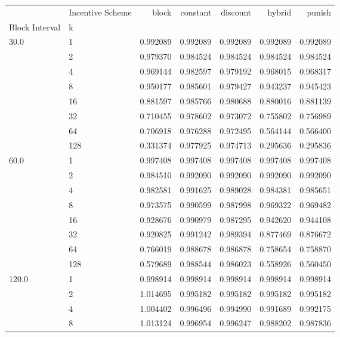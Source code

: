 \begin{tabular}{llrrrrr}
\toprule
      & Incentive Scheme &     block &  constant &  discount &    hybrid &    punish \\
Block Interval & k &           &           &           &           &           \\
\midrule
30.0  & 1   &  0.992089 &  0.992089 &  0.992089 &  0.992089 &  0.992089 \\
      & 2   &  0.979370 &  0.984524 &  0.984524 &  0.984524 &  0.984524 \\
      & 4   &  0.969144 &  0.982597 &  0.979192 &  0.968015 &  0.968317 \\
      & 8   &  0.950177 &  0.985601 &  0.979427 &  0.943237 &  0.945423 \\
      & 16  &  0.881597 &  0.985766 &  0.980688 &  0.880016 &  0.881139 \\
      & 32  &  0.710455 &  0.978602 &  0.973072 &  0.755802 &  0.756989 \\
      & 64  &  0.706918 &  0.976288 &  0.972495 &  0.564144 &  0.566400 \\
      & 128 &  0.331374 &  0.977925 &  0.974713 &  0.295636 &  0.295836 \\
60.0  & 1   &  0.997408 &  0.997408 &  0.997408 &  0.997408 &  0.997408 \\
      & 2   &  0.984510 &  0.992090 &  0.992090 &  0.992090 &  0.992090 \\
      & 4   &  0.982581 &  0.991625 &  0.989028 &  0.984381 &  0.985651 \\
      & 8   &  0.973575 &  0.990599 &  0.987998 &  0.969322 &  0.969482 \\
      & 16  &  0.928676 &  0.990979 &  0.987295 &  0.942620 &  0.944108 \\
      & 32  &  0.920825 &  0.991242 &  0.989394 &  0.877469 &  0.876672 \\
      & 64  &  0.766019 &  0.988678 &  0.986878 &  0.758654 &  0.758870 \\
      & 128 &  0.579689 &  0.988544 &  0.986023 &  0.558926 &  0.560450 \\
120.0 & 1   &  0.998914 &  0.998914 &  0.998914 &  0.998914 &  0.998914 \\
      & 2   &  1.014695 &  0.995182 &  0.995182 &  0.995182 &  0.995182 \\
      & 4   &  1.004402 &  0.996496 &  0.994990 &  0.991689 &  0.992175 \\
      & 8   &  1.013124 &  0.996954 &  0.996247 &  0.988202 &  0.987836 \\

\end{tabular}
